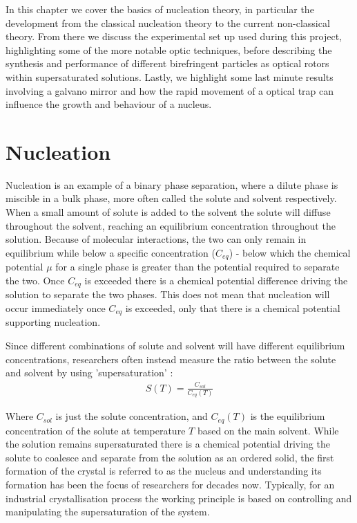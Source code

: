 In this chapter we cover the basics of nucleation theory, in particular
the development from the classical nucleation theory to the current 
non-classical theory. From there we discuss the experimental set up 
used during this project, highlighting some of the more notable 
optic techniques, before describing the synthesis and performance 
of different birefringent particles as optical rotors within 
supersaturated solutions. Lastly, we highlight some last minute 
results involving a galvano mirror and how the rapid movement of a 
optical trap can influence the growth and behaviour of a nucleus. 


\section{Nucleation}
Nucleation is an example of a binary phase separation, 
where a dilute phase is miscible in a bulk phase, more 
often called the solute and solvent respectively. When 
a small amount of solute is added to the solvent the 
solute will diffuse throughout the solvent, reaching
an equilibrium concentration throughout the solution. 
Because of molecular interactions, the two can only remain 
in equilibrium while below a specific concentration ($C_{eq}$) 
- below which the chemical potential $\mu$ for a single phase 
is greater than the potential required to separate the two. 
Once $C_{eq}$ is exceeded there is a chemical potential 
difference driving the solution to separate the two phases.
This does not mean that nucleation will occur immediately 
once $C_{eq}$ is exceeded, only that there is a chemical
potential supporting nucleation.

Since different combinations of solute and solvent will 
have different equilibrium concentrations, researchers often 
instead measure the ratio between the solute and solvent by 
using 'supersaturation' \cite{Mullin2001}:
\begin{align}
	\label{eq:supersaturation}
	S(T) = \frac{C_{sol}}{C_{eq}(T)}
\end{align}

Where $C_{sol}$ is just the solute concentration, and 
$C_{eq}(T)$ is the equilibrium concentration of the solute  
at temperature $T$ based on the main solvent. While the 
solution remains supersaturated there is a chemical 
potential driving the solute to coalesce and separate 
from the solution as an ordered solid, the first 
formation of the crystal is referred to as the 
nucleus and understanding its formation has been the 
focus of researchers for decades now. Typically, for an 
industrial crystallisation process the working principle 
is based on controlling and manipulating the supersaturation 
of the system. 

